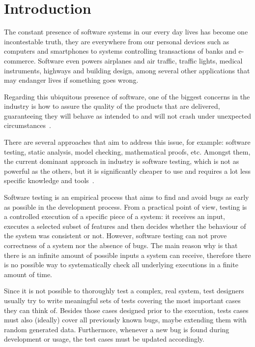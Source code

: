 \chapter{Introduction}

The constant presence of software systems in our every day lives has become one incontestable truth, they are everywhere from our personal devices such as computers and smartphones to systems controlling transactions of banks and e-commerce. Software even powers airplanes and air traffic, traffic lights, medical instruments, highways and building design, among several other applications that may endanger lives if something goes wrong.

Regarding this ubiquitous presence of software, one of the biggest concerns in the industry is how to assure the quality of the products that are delivered, guaranteeing they will behave as intended to and will not crash under unexpected circumstances~\cite{Ammann2008}.

There are several approaches that aim to address this issue, for example: software testing, static analysis, model checking, mathematical proofs, etc. Amongst them, the current dominant approach in industry is software testing, which is not as powerful as the others, but it is significantly cheaper to use and requires a lot less specific knowledge and tools~\cite{Meyer2008, Utting2006}.

Software testing is an empirical process that aims to find and avoid bugs as early as possible in the development process. From a practical point of view, testing is a controlled execution of a specific piece of a system: it receives an input, executes a selected subset of features and then decides whether the behaviour of the system was consistent or not. However, software testing can not prove correctness of a system nor the absence of bugs. The main reason why is that there is an infinite
amount of possible inputs a system can receive, therefore there is no possible way to systematically check all underlying executions in a finite amount of time.

Since it is not possible to thoroughly test a complex, real system, test designers usually try to write meaningful sets of tests covering the most important cases they can think of. Besides those cases designed prior to the execution, tests cases must also (ideally) cover all previously known bugs, maybe extending them with random generated data. Furthermore, whenever a new bug is found during development or usage, the test cases must be updated accordingly.

